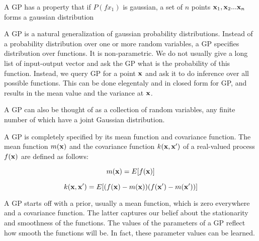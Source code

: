 \documentclass{article}
\begin{document}
A GP has a property that if $P(f x_1)$ is gaussian, a set of $n$ points ${\bf x}_1, {\bf x}_2 ... {\bf x}_n$ forms a gaussian distribution 

A GP is a natural generalization of gaussian probability distributions. Instead of a probability distribution over one or more random variables, a GP specifies distribution over functions. It is non-parametric. We do not usually give a long list of input-output vector and ask the GP what is the probability of this function. Instead, we query GP for a point $\bf x$ and ask it to do inference over all possible functions. This can be done elegentaly and in closed form for GP, and results in the mean value and the variance at $\bf x$.

A GP can also be thought of as a collection of random variables, any finite number of which have a joint Gaussian distribution.


A GP is completely specified by its mean function and covariance function. The mean function $m({\bf x})$ and the covariance function $k({\bf x, x'})$ of a real-valued process $f({\bf x})$ are defined as follows:

\begin{equation}
m({\bf x}) = E[f({\bf x})]
\end{equation}

\begin{equation}
k({\bf x, x'}) = E[(f({\bf x}) - m({\bf x}))(f({\bf x'}) - m({\bf x'}))]
\end{equation}


A GP starts off with a prior, usually a mean function, which is zero everywhere and a covariance function. The latter captures our belief about the stationarity and smoothness of the functions. The values of the parameters of a GP reflect how smooth the functions will be. In fact, these parameter values can be learned.

\newpage


\end{document}

